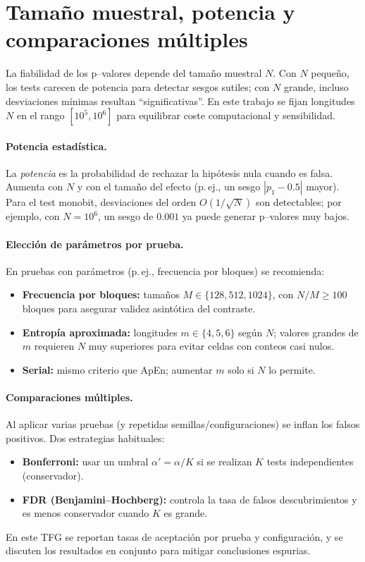 \section*{Tamaño muestral, potencia y comparaciones múltiples}

La fiabilidad de los p--valores depende del tamaño muestral $N$. Con $N$ pequeño, los tests carecen de potencia para detectar sesgos sutiles; con $N$ grande, incluso desviaciones mínimas resultan “significativas”. En este trabajo se fijan longitudes $N$ en el rango $[10^5,10^6]$ para equilibrar coste computacional y sensibilidad.

\paragraph{Potencia estadística.}
La \emph{potencia} es la probabilidad de rechazar la hipótesis nula cuando es falsa. Aumenta con $N$ y con el tamaño del efecto (p.\,ej., un sesgo $|p_1-0.5|$ mayor). Para el test monobit, desviaciones del orden $O(1/\sqrt{N})$ son detectables; por ejemplo, con $N=10^6$, un sesgo de $0.001$ ya puede generar p--valores muy bajos.

\paragraph{Elección de parámetros por prueba.}
En pruebas con parámetros (p.\,ej., frecuencia por bloques) se recomienda:
\begin{itemize}
  \item \textbf{Frecuencia por bloques:} tamaños $M \in \{128,512,1024\}$, con $N/M \ge 100$ bloques para asegurar validez asintótica del contraste.
  \item \textbf{Entropía aproximada:} longitudes $m \in \{4,5,6\}$ según $N$; valores grandes de $m$ requieren $N$ muy superiores para evitar celdas con conteos casi nulos.
  \item \textbf{Serial:} mismo criterio que ApEn; aumentar $m$ solo si $N$ lo permite.
\end{itemize}

\paragraph{Comparaciones múltiples.}
Al aplicar varias pruebas (y repetidas semillas/configuraciones) se inflan los falsos positivos. Dos estrategias habituales:
\begin{itemize}
  \item \textbf{Bonferroni:} usar un umbral $\alpha'=\alpha/K$ si se realizan $K$ tests independientes (conservador).
  \item \textbf{FDR (Benjamini–Hochberg):} controla la tasa de falsos descubrimientos y es menos conservador cuando $K$ es grande.
\end{itemize}
En este TFG se reportan tasas de aceptación por prueba y configuración, y se discuten los resultados en conjunto para mitigar conclusiones espurias.

